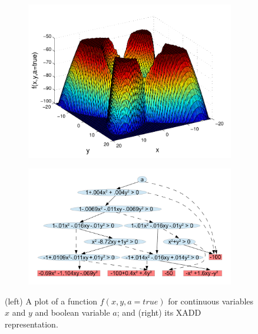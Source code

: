 \begin{figure}[!htb]
    \begin{subfigure}[b]{0.20\textwidth}
        \includegraphics[width=1.0\linewidth]{images/quad2.pdf}
    \end{subfigure}
            \hspace{-5mm}
    \begin{subfigure}[b]{0.24\textwidth}

        \includegraphics[width=1.3\linewidth, height=1.0\linewidth]{images/quad2_xadd5.pdf}
    \end{subfigure}    
    \caption{(left) A plot of a function $f(x, y, a=\mathit{true})$ for continuous variables $x$ and $y$ and boolean variable $a$; and (right) its XADD representation.}
    \label{fig:xadd}
\end{figure}


